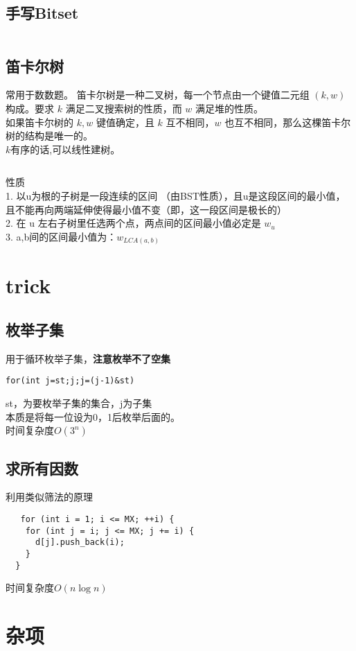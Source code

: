 \documentclass[titlepage, a4paper]{report}
\newcommand{\cppcode}[1]{  
    \inputminted[mathescape]{cpp}{source/#1}  
}
\begin{document}
\section{手写Bitset}
\cppcode{Bitset.cpp}

\section{笛卡尔树}
常用于数数题。
笛卡尔树是一种二叉树，每一个节点由一个键值二元组 $(k,w)$构成。要求 $k$ 满足二叉搜索树的性质，而 $w$ 满足堆的性质。\\
如果笛卡尔树的 $k,w$ 键值确定，且 $k$ 互不相同，$w$ 也互不相同，那么这棵笛卡尔树的结构是唯一的。\\
$k$有序的话,可以线性建树。\\
\cppcode{dkrTree.cpp}
性质\\
1.  以u为根的子树是一段连续的区间 （由BST性质），且u是这段区间的最小值，且不能再向两端延伸使得最小值不变（即，这一段区间是极长的）\\
2. 在 u 左右子树里任选两个点，两点间的区间最小值必定是 $w_u$\\
3.  a,b间的区间最小值为：$w_{LCA(a,b)}$\\

\chapter{trick}

\section{枚举子集}

用于循环枚举子集，\textbf{注意枚举不了空集}
\begin{verbatim}  
for(int j=st;j;j=(j-1)&st) 
\end{verbatim}
st，为要枚举子集的集合，j为子集\\
本质是将每一位设为0，1后枚举后面的。\\
时间复杂度$O(3^n)$
\section{求所有因数}
利用类似筛法的原理\\
\begin{verbatim}  
   for (int i = 1; i <= MX; ++i) {
    for (int j = i; j <= MX; j += i) {
      d[j].push_back(i);
    }
  }
\end{verbatim}
时间复杂度$O(n\log{n})$
\chapter{杂项}
\end{document}
